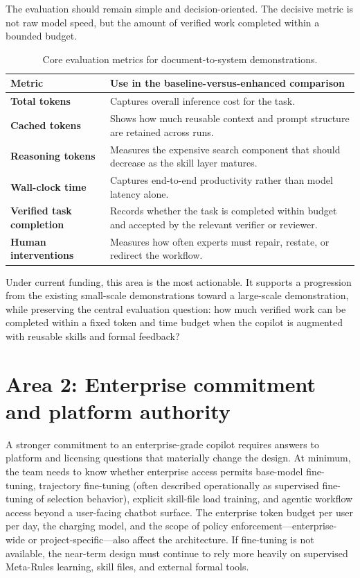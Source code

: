 \documentclass[11pt]{article}
\begin{document}
The evaluation should remain simple and decision-oriented. The decisive metric is not raw model speed, but the amount of verified work completed within a bounded budget.

\begin{table}[H]
\centering
\begin{tabularx}{\textwidth}{>{\bfseries}p{}Y}
\toprule
Metric & Use in the baseline-versus-enhanced comparison \\
\midrule
Total tokens & Captures overall inference cost for the task. \\
Cached tokens & Shows how much reusable context and prompt structure are retained across runs. \\
Reasoning tokens & Measures the expensive search component that should decrease as the skill layer matures. \\
Wall-clock time & Captures end-to-end productivity rather than model latency alone. \\
Verified task completion & Records whether the task is completed within budget and accepted by the relevant verifier or reviewer. \\
Human interventions & Measures how often experts must repair, restate, or redirect the workflow. \\
\bottomrule
\end{tabularx}
\caption{Core evaluation metrics for document-to-system demonstrations.}
\label{tab:metrics}
\end{table}

Under current funding, this area is the most actionable. It supports a progression from the existing small-scale demonstrations toward a large-scale demonstration, while preserving the central evaluation question: how much verified work can be completed within a fixed token and time budget when the copilot is augmented with reusable skills and formal feedback?

\section{Area 2: Enterprise commitment and platform authority}

A stronger commitment to an enterprise-grade copilot requires answers to platform and licensing questions that materially change the design. At minimum, the team needs to know whether enterprise access permits base-model fine-tuning, trajectory fine-tuning (often described operationally as supervised fine-tuning of selection behavior), explicit skill-file load training, and agentic workflow access beyond a user-facing chatbot surface. The enterprise token budget per user per day, the charging model, and the scope of policy enforcement---enterprise-wide or project-specific---also affect the architecture. If fine-tuning is not available, the near-term design must continue to rely more heavily on supervised Meta-Rules learning, skill files, and external formal tools.
\end{document}
